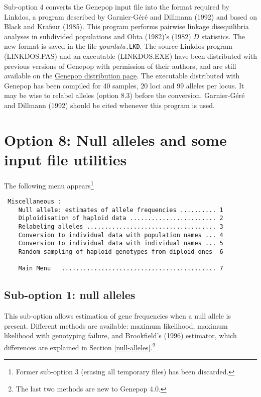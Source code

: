 \documentclass[
  12pt,
]{book}
\begin{document}
Sub-option 4 converts the Genepop input file into the format required by Linkdos, a program described by Garnier-Géré and Dillmann (1992) and based on Black and Krafsur (1985). This program performs pairwise linkage disequilibria analyses in subdivided populations and Ohta (1982)'s (1982) \(D\) statistics. The new format is saved in the file \emph{yourdata}\texttt{.LKD}. The source Linkdos program (LINKDOS.PAS) and an executable (LINKDOS.EXE) have been distributed with previous versions of Genepop with permission of their authors, and are still available on the \href{https://kimura.univ-montp2.fr/~rousset/Genepop.htm}{Genepop distribution page}. The executable distributed with Genepop has been compiled for 40 samples, 20 loci and 99 alleles per locus. It may be wise to relabel alleles (option 8.3) before the conversion. Garnier-Géré and Dillmann (1992) should be cited whenever this program is used.

\hypertarget{option-8-null-alleles-and-some-input-file-utilities}{%
\section{Option 8: Null alleles and some input file utilities}\label{option-8-null-alleles-and-some-input-file-utilities}}

The following menu appears\footnote{Former sub-option 3 (erasing all temporary files) has been discarded.}

\begin{verbatim}
 Miscellaneous :
    Null allele: estimates of allele frequencies .......... 1
    Diploidisation of haploid data ........................ 2
    Relabeling alleles .................................... 3
    Conversion to individual data with population names ... 4
    Conversion to individual data with individual names ... 5
    Random sampling of haploid genotypes from diploid ones  6

    Main Menu   ........................................... 7
\end{verbatim}

\hypertarget{sub-option-1-null-alleles}{%
\subsection{Sub-option 1: null alleles}\label{sub-option-1-null-alleles}}

This sub-option allows estimation of gene frequencies when a null allele is present. Different methods are available: maximum likelihood, maximum likelihood with genotyping failure, and Brookfield's (1996) estimator, which differences are explained in Section \ref{null-alleles}.\footnote{The last two methods are new to Genepop 4.0.}
\end{document}
